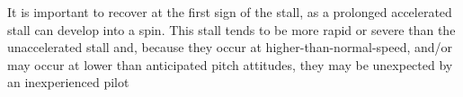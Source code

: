It is important to recover at the first sign of the stall, as a prolonged
accelerated stall can develop into a spin. This stall tends to be more rapid or
severe than the unaccelerated stall and, because they occur at
higher-than-normal-speed, and/or may occur at lower than anticipated pitch
attitudes, they may be unexpected by an inexperienced pilot
